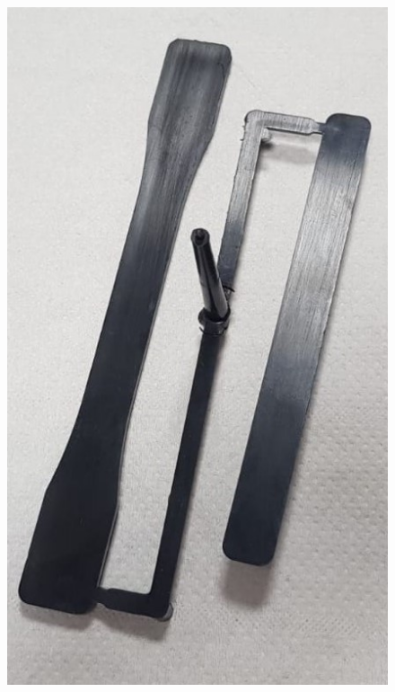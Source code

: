 \documentclass[a4paper, 11pt]{article}
\begin{document}
\begin{figure}[htp]
{\includegraphics[scale=0.247]{PE-PP}} \qquad
\subfloat[][]

\end{figure}
\end{document}
